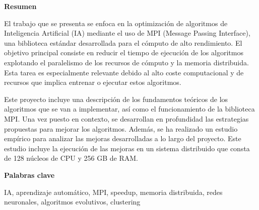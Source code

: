 
\newpage

\thispagestyle{empty}

\begin{center}

{\bf \Huge Resumen}

  \end{center}
\vspace{1cm}

El trabajo que se presenta se enfoca en la optimización de algoritmos de Inteligencia  Artificial (IA) mediante el uso de MPI (Message Passing Interface), una biblioteca estándar desarrollada para el cómputo de alto rendimiento. 
El objetivo principal consiste en reducir el tiempo de ejecución de los algoritmos explotando el paralelismo de los recursos de cómputo y la memoria distribuida. Esta tarea es especialmente relevante debido al alto coste computacional y de recursos que implica entrenar o ejecutar estos algoritmos.

Este proyecto incluye una descripción de los fundamentos teóricos de los algoritmos que se van a implementar, así como el funcionamiento de la biblioteca MPI. 
Una vez puesto en contexto, se desarrollan en profundidad las estrategias propuestas para mejorar los algoritmos.
Además, se ha realizado un estudio empírico para analizar las mejoras desarrolladas a lo largo del proyecto. Este estudio incluye la ejecución de las mejoras en un sistema distribuido que consta de 128 núcleos de CPU y 256 GB de RAM.



\vspace{1cm}


\begin{center}

{\bf \Large Palabras clave}

   \end{center}

   \vspace{0.5cm}
   
   IA, aprendizaje automático, MPI, speedup, memoria distribuida, redes neuronales, algoritmos evolutivos, clustering
   
   



